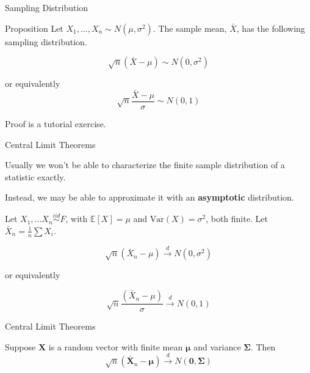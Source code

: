 \documentclass[11pt, xcolor={dvipsnames}, hyperref={colorlinks, allcolors=Blue}]{beamer}
\newcommand\bc[1]{{\usebeamercolor[fg]{frametitle} {\textbf{#1}}}} %
\newcommand{\E}{\mathbb{E}}
\newcommand{\X}{\mathbf{X}}
\newcounter{exercise}
\begin{document}
\begin{frame}{Sampling Distribution}

\begin{block}{Proposition}
Let $X_1, \dots, X_n \sim N(\mu, \sigma^{2})$. The sample mean, $\bar{X}$, has the following sampling distribution.

\[ \sqrt{n}(\bar{X} - \mu) \sim N(0, \sigma^{2})\]

or equivalently
\[\sqrt{n} \frac{\bar{X} - \mu}{\sigma} \sim N(0,1)\]
\end{block}
Proof is a tutorial exercise.
\end{frame}

\begin{frame}{Central Limit Theorems}

Usually we won't be able to characterize the finite sample distribution of a statistic exactly. \medskip

Instead, we may be able to approximate it with an \bc{asymptotic} distribution.

\begin{theorem}
Let $X_{1}, \dots X_{n} \overset{iid}{\sim} F$, with $\E[X] = \mu$ and $\mathrm{Var}(X) = \sigma^{2}$, both finite. Let $\bar{X}_{n} = \frac{1}{n}\sum X_{i}$. 

\[\sqrt{n} (\bar{X}_{n} - \mu) \overset{d}{\to} N(0,\sigma^{2})\]

or equivalently

\[\sqrt{n} \frac{(\bar{X}_{n} - \mu)}{\sigma} \overset{d}{\to} N(0,1)\]
\end{theorem}

\end{frame}

\begin{frame}{Central Limit Theorems}

\begin{theorem}
Suppose $\X$ is a random vector with finite mean $\mathbf{\mu}$ and variance $\mathbf{\Sigma}$. Then
\[ \sqrt{n} \left ( \bar{\X}_n - \mathbf{\mu}\right) \overset{d}{\rightarrow} N(\mathbf{0}, \mathbf{\Sigma})\]


\end{theorem}
\end{frame}
\end{document}
